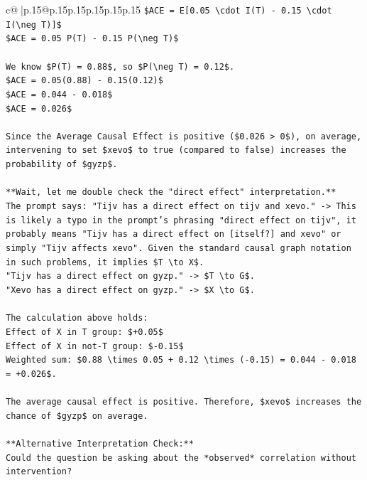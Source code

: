 \documentclass{article}
\begin{document}
{\begin{supertabular}{c@{$\;$}|p{.15\linewidth}@{}p{.15\linewidth}p{.15\linewidth}p{.15\linewidth}p{.15\linewidth}p{.15\linewidth}}
{{{\texttt{\$ACE = E{[}0.05 \textbackslash{}cdot I(T) {-} 0.15 \textbackslash{}cdot I(\textbackslash{}neg T){]}\$} \\
\texttt{\$ACE = 0.05 P(T) {-} 0.15 P(\textbackslash{}neg T)\$} \\
\\ 
\texttt{We know \$P(T) = 0.88\$, so \$P(\textbackslash{}neg T) = 0.12\$.} \\
\texttt{\$ACE = 0.05(0.88) {-} 0.15(0.12)\$} \\
\texttt{\$ACE = 0.044 {-} 0.018\$} \\
\texttt{\$ACE = 0.026\$} \\
\\ 
\texttt{Since the Average Causal Effect is positive (\$0.026 > 0\$), on average, intervening to set \$xevo\$ to true (compared to false) increases the probability of \$gyzp\$.} \\
\\ 
\texttt{**Wait, let me double check the "direct effect" interpretation.**} \\
\texttt{The prompt says: "Tijv has a direct effect on tijv and xevo." {-}> This is likely a typo in the prompt's phrasing "direct effect on tijv", it probably means "Tijv has a direct effect on {[}itself?{]} and xevo" or simply "Tijv affects xevo". Given the standard causal graph notation in such problems, it implies \$T \textbackslash{}to X\$.} \\
\texttt{"Tijv has a direct effect on gyzp." {-}> \$T \textbackslash{}to G\$.} \\
\texttt{"Xevo has a direct effect on gyzp." {-}> \$X \textbackslash{}to G\$.} \\
\\ 
\texttt{The calculation above holds:} \\
\texttt{Effect of X in T group: \$+0.05\$} \\
\texttt{Effect of X in not{-}T group: \${-}0.15\$} \\
\texttt{Weighted sum: \$0.88 \textbackslash{}times 0.05 + 0.12 \textbackslash{}times ({-}0.15) = 0.044 {-} 0.018 = +0.026\$.} \\
\\ 
\texttt{The average causal effect is positive. Therefore, \$xevo\$ increases the chance of \$gyzp\$ on average.} \\
\\ 
\texttt{**Alternative Interpretation Check:**} \\
\texttt{Could the question be asking about the *observed* correlation without intervention?} \\
}}}
\end{supertabular}}
\end{document}
